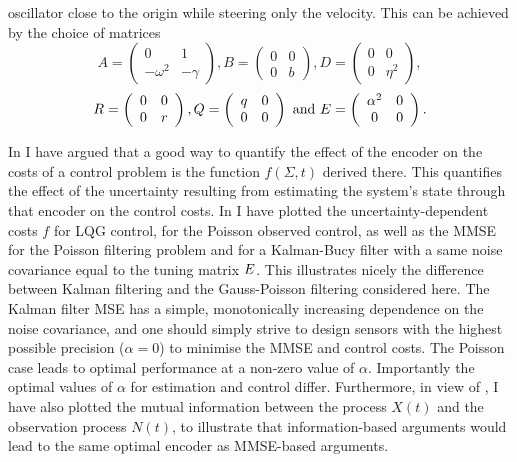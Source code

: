 oscillator close to the origin while steering only the velocity. This can be achieved by the choice of matrices
\[
A = \left(\begin{array}{cc}0& 1\\ -\omega^2 & -\gamma\end{array}\right), B=  \left(\begin{array}{cc}0& 0\\ 0 & b\end{array}\right), D = \left(\begin{array}{cc}0&0\\ 0&\eta^2\end{array}\right),
\]
\[
R=\left(\begin{array}{cc}0&0\\0&r\end{array}\right), Q = \left(\begin{array}{cc} q& 0\\0& 0\end{array}\right)\textrm{ and } E =\left(\begin{array}{cc}\alpha^2&0\\0&0\end{array}\right).
\]\par

In  I have argued that a good way to quantify the effect of the encoder on the costs of a control problem is the function $f(\Sigma,t)$ derived there. This quantifies
the effect of the uncertainty resulting from estimating the system's state through that encoder on the control costs.
In  I have plotted the uncertainty-dependent costs $f$ for LQG control, for the Poisson observed control, as well as the MMSE for the Poisson
filtering problem and for a Kalman-Bucy filter with a same noise covariance equal to the tuning matrix $E$. This
illustrates nicely the difference between Kalman filtering and the Gauss-Poisson filtering considered here. The Kalman filter MSE has a simple, monotonically
increasing dependence on the noise
covariance, and one should simply strive to design sensors with the highest possible precision ($\alpha=0$) to minimise the MMSE and control costs. The Poisson case
leads to optimal performance at a non-zero value of $\alpha$. Importantly the optimal values of $\alpha$ for estimation and control differ. Furthermore, in view of
, I have also
plotted the mutual information between the process $X(t)$ and the observation process $N(t)$, to illustrate that information-based arguments would lead to the same
optimal encoder as MMSE-based arguments.\par

